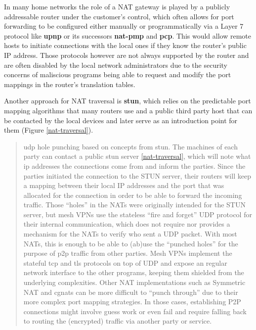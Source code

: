 In many home networks the role of a NAT gateway is played by a publicly
addressable router under the customer's control, which often allows for
port forwarding to be configured either manually or programmatically via
a Layer 7 protocol like \textbf{\gls{upnp}} or its successors
\textbf{\gls{nat-pmp}} and \textbf{\gls{pcp}}. This would allow remote
hosts to initiate connections with the local ones if they know the
router's public IP address. Those protocols however are not always
supported by the router and are often disabled by the local network
administrators due to the security concerns of maliscious programs being
able to request and modify the port mappings in the router's translation
tables.

Another approach for NAT traversal is \textbf{\gls{stun}}, which relies
on the predictable port mapping algorithms that many routers use and a
public third party host that can be contacted by the local devices and
later serve as an introduction point for them (Figure
\ref{nat-traversal}).


\begin{quote}
\gls{udp} hole punching based on concepts from \gls{stun}. The machines
of each party can contact a public \gls{stun} server
\ref{nat-traversal}, which will note what \gls{ip} addresses the
connections come from and inform the parties. Since the parties
initiated the connection to the STUN server, their routers will keep a
mapping between their local IP addresses and the port that was allocated
for the connection in order to be able to forward the incoming traffic.
Those ``holes'' in the NATs were originally intended for the STUN
server, but mesh VPNs use the stateless ``fire and forget'' UDP protocol
for their internal communication, which does not require nor provides a
mechanism for the NATs to verify who sent a UDP packet. With most NATs,
this is enough to be able to (ab)use the ``punched holes'' for the
purpose of \gls{p2p} traffic from other parties. Mesh VPNs implement the
stateful \gls{tcp} and \gls{tls} protocols on top of UDP and expose an
regular network interface to the other programs, keeping them shielded
from the underlying complexities. Other NAT implementations such as
Symmetric NAT and \glspl{cgnat} can be more difficult to ``punch
through'' due to their more complex port mapping strategies. In those
cases, establishing P2P connections might involve guess work or even
fail and require falling back to routing the (encrypted) traffic via
another party or service.
\end{quote}

